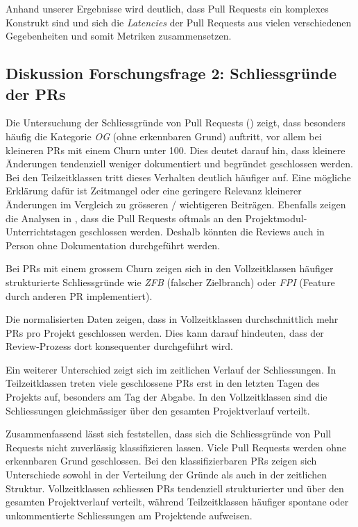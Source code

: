 Anhand unserer Ergebnisse wird deutlich, dass Pull Requests ein komplexes Konstrukt sind und sich die \textit{Latencies} der Pull Requests aus vielen verschiedenen Gegebenheiten und somit Metriken zusammensetzen.

\subsection{Diskussion Forschungsfrage 2: Schliessgründe der PRs}
Die Untersuchung der Schliessgründe von Pull Requests () zeigt, dass besonders häufig die Kategorie \textit{OG} (ohne erkennbaren Grund) auftritt, vor allem bei kleineren PRs mit einem Churn unter 100. Dies deutet darauf hin, dass kleinere Änderungen tendenziell weniger dokumentiert und begründet geschlossen werden. \\
Bei den  Teilzeitklassen tritt dieses Verhalten deutlich häufiger auf. Eine mögliche Erklärung dafür ist Zeitmangel oder eine geringere Relevanz kleinerer Änderungen im Vergleich zu grösseren / wichtigeren Beiträgen. Ebenfalls zeigen die Analysen in , dass die Pull Requests oftmals an den Projektmodul-Unterrichtstagen geschlossen werden. Deshalb könnten die Reviews auch in Person ohne Dokumentation durchgeführt werden. 

Bei PRs mit einem grossem Churn zeigen sich in den Vollzeitklassen häufiger strukturierte Schliessgründe wie \textit{ZFB} (falscher Zielbranch) oder \textit{FPI} (Feature durch anderen PR implementiert).

Die normalisierten Daten zeigen, dass in Vollzeitklassen durchschnittlich mehr PRs pro Projekt geschlossen werden. Dies kann darauf hindeuten, dass der Review-Prozess dort konsequenter durchgeführt wird.

Ein weiterer Unterschied zeigt sich im zeitlichen Verlauf der Schliessungen. In Teilzeitklassen treten viele geschlossene PRs erst in den letzten Tagen des Projekts auf, besonders am Tag der Abgabe. In den Vollzeitklassen sind die Schliessungen gleichmässiger über den gesamten Projektverlauf verteilt.

Zusammenfassend lässt sich feststellen, dass sich die Schliessgründe von Pull Requests nicht zuverlässig klassifizieren lassen. Viele Pull Requests werden ohne erkennbaren Grund geschlossen. Bei den klassifizierbaren PRs zeigen sich Unterschiede sowohl in der Verteilung der Gründe als auch in der zeitlichen Struktur. Vollzeitklassen schliessen PRs tendenziell strukturierter und über den gesamten Projektverlauf verteilt, während Teilzeitklassen häufiger spontane oder unkommentierte Schliessungen am Projektende aufweisen.


